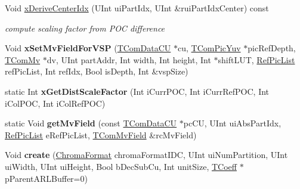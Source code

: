 \begin{DoxyCompactItemize}
\item 
\mbox{\label{class_t_com_data_c_u_a468bab165a4291ffd84cfafc87d50305}} 
Void \hyperlink{class_t_com_data_c_u_a468bab165a4291ffd84cfafc87d50305}{x\+Derive\+Center\+Idx} (U\+Int ui\+Part\+Idx, U\+Int \&rui\+Part\+Idx\+Center) const
\begin{DoxyCompactList}\small\item\em compute scaling factor from P\+OC difference \end{DoxyCompactList}\item 
\mbox{\label{class_t_com_data_c_u_a3182c5c9392c920427cf36794223921b}} 
Void {\bfseries x\+Set\+Mv\+Field\+For\+V\+SP} (\hyperlink{class_t_com_data_c_u}{T\+Com\+Data\+CU} $\ast$cu, \hyperlink{class_t_com_pic_yuv}{T\+Com\+Pic\+Yuv} $\ast$pic\+Ref\+Depth, \hyperlink{class_t_com_mv}{T\+Com\+Mv} $\ast$dv, U\+Int part\+Addr, Int width, Int height, Int $\ast$shift\+L\+UT, \hyperlink{_type_def_8h_a93cea48eb9dcfd661168dee82e41b384}{Ref\+Pic\+List} ref\+Pic\+List, Int ref\+Idx, Bool is\+Depth, Int \&vsp\+Size)
\item 
\mbox{\label{class_t_com_data_c_u_a19bd58bf3871a2bcfb5633cdae578d10}} 
static Int {\bfseries x\+Get\+Dist\+Scale\+Factor} (Int i\+Curr\+P\+OC, Int i\+Curr\+Ref\+P\+OC, Int i\+Col\+P\+OC, Int i\+Col\+Ref\+P\+OC)
\item 
\mbox{\label{class_t_com_data_c_u_a9df6d8baeab2adb033e29de1540af995}} 
static Void {\bfseries get\+Mv\+Field} (const \hyperlink{class_t_com_data_c_u}{T\+Com\+Data\+CU} $\ast$pc\+CU, U\+Int ui\+Abs\+Part\+Idx, \hyperlink{_type_def_8h_a93cea48eb9dcfd661168dee82e41b384}{Ref\+Pic\+List} e\+Ref\+Pic\+List, \hyperlink{class_t_com_mv_field}{T\+Com\+Mv\+Field} \&rc\+Mv\+Field)
\item 
\mbox{\label{class_t_com_data_c_u_a80ec1237d0997a02b0d939447841a2ed}} 
Void {\bfseries create} (\hyperlink{_type_def_8h_a4a6c51c10f2eb04abc7209db7caff39f}{Chroma\+Format} chroma\+Format\+I\+DC, U\+Int ui\+Num\+Partition, U\+Int ui\+Width, U\+Int ui\+Height, Bool b\+Dec\+Sub\+Cu, Int unit\+Size, \hyperlink{_type_def_8h_a5bdd3b17d14ed1978c366d2d958c0300}{T\+Coeff} $\ast$p\+Parent\+A\+R\+L\+Buffer=0)
\item 
\mbox{\label{class_t_com_data_c_u_a6502127af3cc5e9118abdad0840635ad}} 

\end{DoxyCompactItemize}
